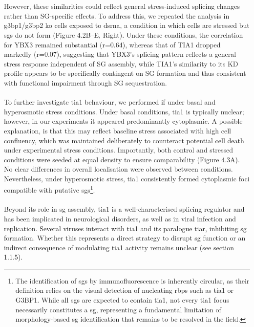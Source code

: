 \\
\\
However, these similarities could reflect general stress-induced splicing changes rather than SG-specific effects. To address this, we repeated the analysis in \gls{g3bp1}/\gls{g3bp2} \gls{ko} cells exposed to \gls{dsrna}, a condition in which cells are stressed but \glspl{sg} do not form\cite{paget_stress_2023} (Figure 4.2B–E, Right). Under these conditions, the correlation for YBX3 remained substantial (r=0.64), whereas that of TIA1 dropped markedly (r=0.07), suggesting that YBX3's splicing pattern reflects a general stress response independent of SG assembly, while TIA1's similarity to its KD profile appears to be specifically contingent on SG formation and thus consistent with functional impairment through SG sequestration.
\\
\\
To further investigate \gls{tia1} behaviour, we performed \gls{if} under basal and hyperosmotic stress conditions. Under basal conditions, \gls{tia1} is typically nuclear\cite{noauthor_human_nodate, thul_subcellular_2017}; however, in our experiments it appeared predominantly cytoplasmic. A possible explanation, is that this may reflect baseline stress associated with high cell confluency, which was maintained deliberately to counteract potential cell death under experimental stress conditions. Importantly, both control and stressed conditions were seeded at equal density to ensure comparability (Figure 4.3A). No clear differences in overall localisation were observed between conditions. Nevertheless, under hyperosmotic stress, \gls{tia1} consistently formed cytoplasmic foci compatible with putative \glspl{sg}\footnote{The identification of \glspl{sg} by immunofluorescence is inherently circular, as their definition relies on the visual detection of nucleating \glspl{rbp} such as \gls{tia1} or G3BP1. While all \glspl{sg} are expected to contain \gls{tia1}, not every \gls{tia1} focus necessarily constitutes a \gls{sg}, representing a fundamental limitation of morphology-based \gls{sg} identification that remains to be resolved in the field.}.
\\
\\
Beyond its role in \gls{sg} assembly\cite{gilks_stress_2004}, \gls{tia1} is a well-characterised splicing regulator\cite{del_gatto-konczak_rna-binding_2000} and has been implicated in neurological disorders\cite{mackenzie_tia1_2017}, as well as in viral infection and replication\cite{emara_interaction_2007}. Several viruses interact with \gls{tia1} and its paralogue \gls{tiar}, inhibiting \gls{sg} formation\cite{emara_interaction_2007}. Whether this represents a direct strategy to disrupt \gls{sg} function or an indirect consequence of modulating \gls{tia1} activity remains unclear (see section 1.1.5).
